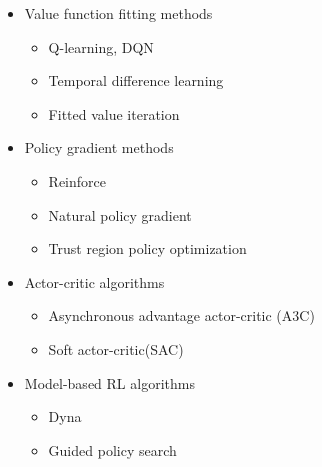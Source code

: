 \documentclass[]{article}
\begin{document}
\begin{itemize}
    \item Value function fitting methods \begin{itemize}
        \item Q-learning, DQN
        \item Temporal difference learning
        \item Fitted value iteration
    \end{itemize}
    \item Policy gradient methods
        \begin{itemize}
            \item Reinforce
            \item Natural policy gradient
            \item Trust region policy optimization
        \end{itemize}
    \item Actor-critic algorithms
        \begin{itemize}
            \item Asynchronous advantage actor-critic (A3C)
            \item Soft actor-critic(SAC)
        \end{itemize}
    \item Model-based RL algorithms
        \begin{itemize}
            \item Dyna
            \item Guided policy search
        \end{itemize}
\end{itemize}
\end{document}
